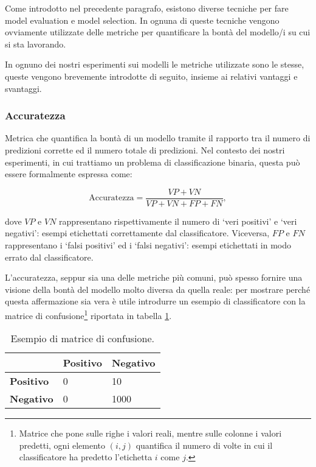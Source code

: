 \documentclass[../../main.tex]{subfiles}
\begin{document}
    Come introdotto nel precedente paragrafo, esistono diverse tecniche per fare model evaluation e model selection. In ognuna di queste tecniche vengono ovviamente utilizzate delle metriche per quantificare la bontà del modello/i su cui si sta lavorando.

    In ognuno dei nostri esperimenti sui modelli le metriche utilizzate sono le stesse, queste vengono brevemente introdotte di seguito, insieme ai relativi vantaggi e svantaggi.

    \subsubsection{Accuratezza}
    Metrica che quantifica la bontà di un modello tramite il rapporto tra il numero di predizioni corrette ed il numero totale di predizioni. Nel contesto dei nostri esperimenti, in cui trattiamo un problema di classificazione binaria, questa può essere formalmente espressa come: 

    \begin{equation}
        \mathrm{Accuratezza} = \frac{VP + VN}{VP + VN + FP + FN},
    \end{equation}

    dove $VP$ e $VN$ rappresentano rispettivamente il numero di `veri positivi' e `veri negativi': esempi etichettati correttamente dal classificatore. Viceversa, $FP$ e $FN$ rappresentano i `falsi positivi' ed i `falsi negativi': esempi etichettati in modo errato dal classificatore.

    L'accuratezza, seppur sia una delle metriche più comuni, può spesso fornire una visione della bontà del modello molto diversa da quella reale: per mostrare perché questa affermazione sia vera è utile introdurre un esempio di classificatore con la matrice di confusione\footnote{Matrice che pone sulle righe i valori reali, mentre sulle colonne i valori predetti, ogni elemento $(i,j)$ quantifica il numero di volte in cui il classificatore ha predetto l'etichetta $i$ come $j$.} riportata in tabella \ref{tab:matriceConfusione}.

    \begin{table}[H]
        \centering
        \begin{tabular}{l|ll}
                            & \textbf{Positivo} & \textbf{Negativo} \\ \hline
        \textbf{Positivo} & 0                 & 10                 \\
        \textbf{Negativo} & 0                 & 1000             
        \end{tabular}
        \caption{Esempio di matrice di confusione.}  
        \label{tab:matriceConfusione}    
    \end{table}
\end{document}
